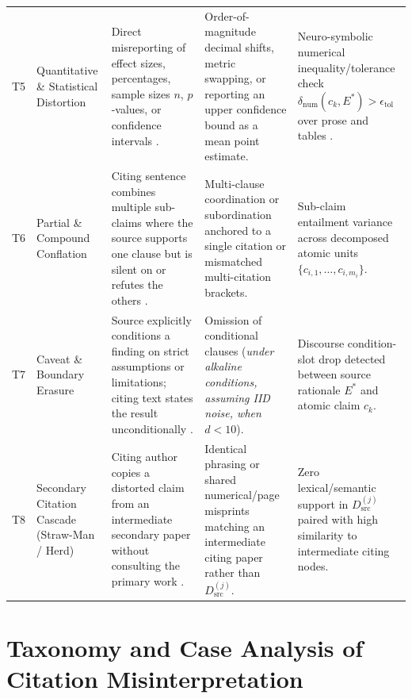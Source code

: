 \documentclass[journal]{IEEEtran}
\begin{document}
\begin{table}[t]
\begin{tabularx}{\textwidth}{L{0.5cm} L{3.0cm} L{4.2cm} L{4.2cm} Y}
T5 & Quantitative \& Statistical Distortion & Direct misreporting of effect sizes, percentages, sample sizes $n$, $p$-values, or confidence intervals \cite{harzing2002referencing,rekdal2014urban}. & Order-of-magnitude decimal shifts, metric swapping, or reporting an upper confidence bound as a mean point estimate. & Neuro-symbolic numerical inequality/tolerance check $\delta_{\text{num}}(c_k, E^*) > \epsilon_{\text{tol}}$ over prose and tables \cite{lu2023scitab}. \\
T6 & Partial \& Compound Conflation & Citing sentence combines multiple sub-claims where the source supports one clause but is silent on or refutes the others \cite{kamoi2023wice,min2023factscore}. & Multi-clause coordination or subordination anchored to a single citation or mismatched multi-citation brackets. & Sub-claim entailment variance across decomposed atomic units $\{c_{i,1}, \dots, c_{i,m_i}\}$. \\
T7 & Caveat \& Boundary Erasure & Source explicitly conditions a finding on strict assumptions or limitations; citing text states the result unconditionally \cite{hyland1998hedging,smith2020quotation}. & Omission of conditional clauses (\emph{under alkaline conditions, assuming IID noise, when $d < 10$}). & Discourse condition-slot drop detected between source rationale $E^*$ and atomic claim $c_k$. \\
T8 & Secondary Citation Cascade (Straw-Man / Herd) & Citing author copies a distorted claim from an intermediate secondary paper without consulting the primary work \cite{simkin2003read,rekdal2014sinking}. & Identical phrasing or shared numerical/page misprints matching an intermediate citing paper rather than $D_{\text{src}}^{(j)}$. & Zero lexical/semantic support in $D_{\text{src}}^{(j)}$ paired with high similarity to intermediate citing nodes. \\
\bottomrule
\end{tabularx}
\end{table}

\section{Taxonomy and Case Analysis of Citation Misinterpretation}
\label{sec:taxonomy}
\end{document}
